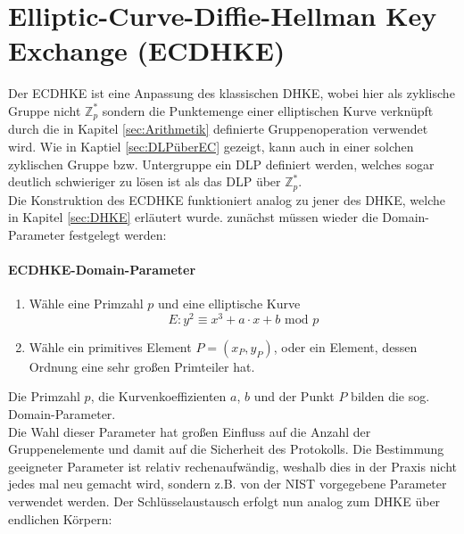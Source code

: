 \section{Elliptic-Curve-Diffie-Hellman Key Exchange (ECDHKE)}
Der ECDHKE ist eine Anpassung des klassischen DHKE, wobei hier als zyklische Gruppe nicht $\mathbb{Z}_p^*$ sondern die Punktemenge einer elliptischen Kurve verknüpft durch die in Kapitel \ref{sec:Arithmetik} definierte Gruppenoperation verwendet wird. Wie in Kaptiel \ref{sec:DLPüberEC} gezeigt, kann auch in einer solchen zyklischen Gruppe bzw. Untergruppe ein DLP definiert werden, welches sogar deutlich schwieriger zu lösen ist als das DLP über $\mathbb{Z}_p^*$.\\

Die Konstruktion des ECDHKE funktioniert analog zu jener des DHKE, welche in Kapitel \ref{sec:DHKE} erläutert wurde. zunächst müssen wieder die Domain-Parameter festgelegt werden:

\paragraph{ECDHKE-Domain-Parameter}
\begin{enumerate}
\item Wähle eine Primzahl $p$ und eine elliptische Kurve $$E: y^2 \equiv x^3 + a \cdot x +b \text{ mod } p$$
\item Wähle ein primitives Element  $P = (x_P, y_P)$, oder ein Element, dessen Ordnung eine sehr großen Primteiler hat.
\end{enumerate}
Die Primzahl $p$, die Kurvenkoeffizienten $a$, $b$ und der Punkt $P$ bilden die sog. Domain-Parameter.\\

Die Wahl dieser Parameter hat großen Einfluss auf die Anzahl der Gruppenelemente und damit auf die Sicherheit des Protokolls. Die Bestimmung geeigneter Parameter ist relativ rechenaufwändig, weshalb dies in der Praxis nicht jedes mal neu gemacht wird, sondern z.B. von der NIST vorgegebene Parameter verwendet werden. Der Schlüsselaustausch erfolgt nun analog zum DHKE über endlichen Körpern:

